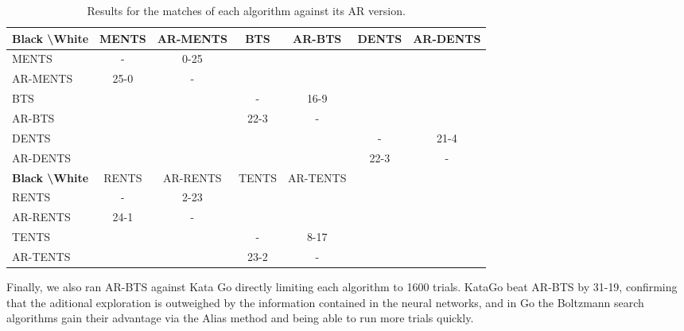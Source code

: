     \begin{table*}[]
    \centering
        \begin{tabular}{l|cccccc}
            \textbf{Black \textbackslash White}     & MENTS     & AR-MENTS  & BTS       & AR-BTS    & DENTS     & AR-DENTS  \\ 
            \hline
                                    MENTS           &   -       & 0-25      &           &           &           &           \\
                                    AR-MENTS        & 25-0      &   -       &           &           &           &           \\
                                    BTS             &           &           &   -       & 16-9      &           &           \\
                                    AR-BTS          &           &           & 22-3      &   -       &           &           \\
                                    DENTS           &           &           &           &           &   -       & 21-4      \\
                                    AR-DENTS        &           &           &           &           & 22-3      & -         \\      
            \hline
            \textbf{Black \textbackslash White}     & RENTS     & AR-RENTS  & TENTS     & AR-TENTS  &           &           \\ 
            \hline
                                    RENTS           &   -       & 2-23      &           &           &           &           \\
                                    AR-RENTS        & 24-1      &   -       &           &           &           &           \\
                                    TENTS           &           &           &   -       & 8-17      &           &           \\
                                    AR-TENTS        &           &           & 23-2      & -         &           &           \\         
        \end{tabular}
        \caption{Results for the matches of each algorithm against its AR version.\label{tab:y10}}
    \end{table*}
    
    
    
    Finally, we also ran AR-BTS against Kata Go directly limiting each algorithm to 1600 trials. KataGo beat AR-BTS by 31-19, confirming that the aditional exploration is outweighed by the information contained in the neural networks, and in Go the Boltzmann search algorithms gain their advantage via the Alias method and being able to run more trials quickly.


